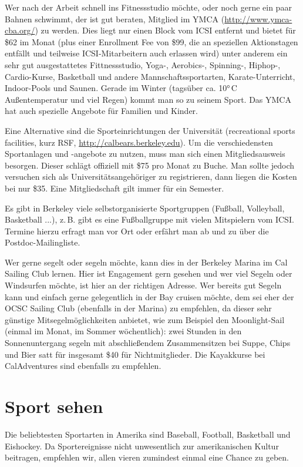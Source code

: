 \documentclass[a4paper]{scrreprt}
\begin{document}
Wer nach der Arbeit schnell ins Fitnessstudio möchte, oder noch gerne
ein paar Bahnen schwimmt, der ist gut beraten, Mitglied im YMCA
(\url{http://www.ymca-cba.org/}) zu werden. Dies liegt nur einen Block
vom ICSI entfernt und bietet für \$62 im Monat (plus einer Enrollment
Fee von \$99, die an speziellen Aktionstagen entfällt und teilweise
ICSI-Mitarbeitern auch erlassen wird) unter anderem ein sehr gut
ausgestattetes Fittnessstudio, Yoga-, Aerobics-, Spinning-, Hiphop-,
Cardio-Kurse, Basketball und andere Mannschaftssportarten,
Karate-Unterricht, Indoor-Pools und Saunen. Gerade im Winter (tagsüber
ca. 10°\,C Außentemperatur und viel Regen) kommt man so zu seinem
Sport. Das YMCA hat auch spezielle Angebote für Familien und Kinder. 

Eine Alternative sind die Sporteinrichtungen der Universität
(recreational sports facilities, kurz RSF,
\url{http://calbears.berkeley.edu}). Um die verschiedensten
Sportanlagen und -angebote zu nutzen, muss man sich einen
Mitgliedsausweis besorgen. Dieser schlägt offiziell mit \$75 pro
Monat zu Buche. Man sollte jedoch versuchen sich als
Universitätsangehöriger zu registrieren, dann liegen die Kosten bei
nur \$35. Eine Mitgliedschaft gilt immer für ein Semester.

Es gibt in Berkeley viele selbstorganisierte Sportgruppen (Fußball,
Volleyball, Basketball ...), z.\,B. gibt es eine Fußballgruppe mit
vielen Mitspielern vom ICSI. Termine hierzu erfragt man vor Ort oder
erfährt man ab und zu über die Postdoc-Mailingliste.

Wer gerne segelt oder segeln möchte, kann dies in der Berkeley Marina
im Cal Sailing Club lernen. Hier ist Engagement gern gesehen und wer
viel Segeln oder Windsurfen möchte, ist hier an der richtigen
Adresse. Wer bereits gut Segeln kann und einfach gerne gelegentlich in
der Bay cruisen möchte, dem sei eher der OCSC Sailing Club (ebenfalls
in der Marina) zu empfehlen, da dieser sehr günstige
Mitsegelmöglichkeiten anbietet, wie zum Beispiel den Moonlight-Sail
(einmal im Monat, im Sommer wöchentlich): zwei Stunden in den
Sonnenuntergang segeln mit abschließendem Zusammensitzen bei Suppe,
Chips und Bier satt für insgesamt \$40 für Nichtmitglieder.
Die Kayakkurse bei CalAdventures sind ebenfalls zu empfehlen.

\section{Sport sehen}

Die beliebtesten Sportarten in Amerika sind Baseball, Football, Basketball und Eishockey. Da Sportereignisse nicht unwesentlich zur amerikanischen Kultur beitragen, empfehlen wir, allen vieren zumindest einmal eine Chance zu geben.
\end{document}
